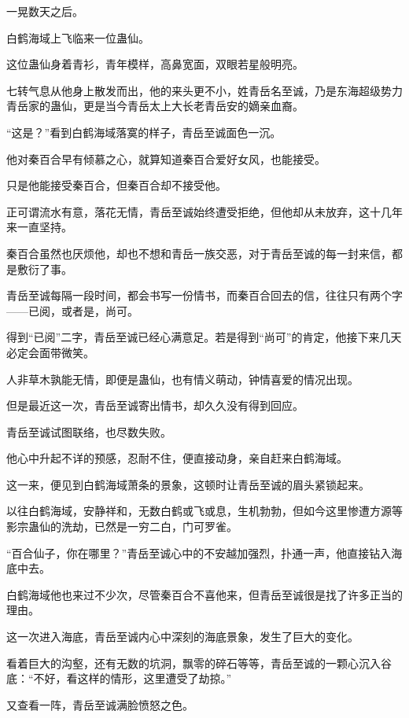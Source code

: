 
\begin{this_body}

一晃数天之后。

白鹤海域上飞临来一位蛊仙。

这位蛊仙身着青衫，青年模样，高鼻宽面，双眼若星般明亮。

七转气息从他身上散发而出，他的来头更不小，姓青岳名至诚，乃是东海超级势力青岳家的蛊仙，更是当今青岳太上大长老青岳安的嫡亲血裔。

“这是？”看到白鹤海域落寞的样子，青岳至诚面色一沉。

他对秦百合早有倾慕之心，就算知道秦百合爱好女风，也能接受。

只是他能接受秦百合，但秦百合却不接受他。

正可谓流水有意，落花无情，青岳至诚始终遭受拒绝，但他却从未放弃，这十几年来一直坚持。

秦百合虽然也厌烦他，却也不想和青岳一族交恶，对于青岳至诚的每一封来信，都是敷衍了事。

青岳至诚每隔一段时间，都会书写一份情书，而秦百合回去的信，往往只有两个字——已阅，或者是，尚可。

得到“已阅”二字，青岳至诚已经心满意足。若是得到“尚可”的肯定，他接下来几天必定会面带微笑。

人非草木孰能无情，即便是蛊仙，也有情义萌动，钟情喜爱的情况出现。

但是最近这一次，青岳至诚寄出情书，却久久没有得到回应。

青岳至诚试图联络，也尽数失败。

他心中升起不详的预感，忍耐不住，便直接动身，亲自赶来白鹤海域。

这一来，便见到白鹤海域萧条的景象，这顿时让青岳至诚的眉头紧锁起来。

以往白鹤海域，安静祥和，无数白鹤或飞或息，生机勃勃，但如今这里惨遭方源等影宗蛊仙的洗劫，已然是一穷二白，门可罗雀。

“百合仙子，你在哪里？”青岳至诚心中的不安越加强烈，扑通一声，他直接钻入海底中去。

白鹤海域他也来过不少次，尽管秦百合不喜他来，但青岳至诚很是找了许多正当的理由。

这一次进入海底，青岳至诚内心中深刻的海底景象，发生了巨大的变化。

看着巨大的沟壑，还有无数的坑洞，飘零的碎石等等，青岳至诚的一颗心沉入谷底：“不好，看这样的情形，这里遭受了劫掠。”

又查看一阵，青岳至诚满脸愤怒之色。


\end{this_body}
